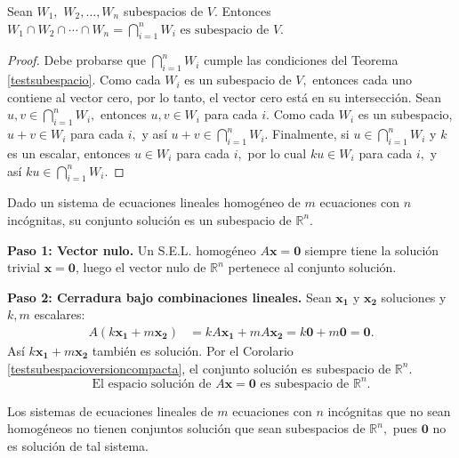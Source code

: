 \begin{theorem}\label{interseccionsubespacios}
Sean $W_1,$ $W_2,\dots, W_n$ subespacios de $V$. Entonces $W_1\cap W_2 \cap \cdots \cap W_n =\bigcap_{i=1}^{n} W_i\text{ es subespacio de }V.$

\begin{proof} Debe probarse que $\bigcap_{i=1}^{n} W_i$ cumple las condiciones del Teorema \ref{testsubespacio}. Como cada $W_i$ es un subespacio de $V,$ entonces cada uno contiene al vector cero, por lo tanto, el vector cero está en su intersección. Sean $u,v\in \bigcap_{i=1}^{n} W_i,$ entonces $u,v\in W_i$ para cada $i.$ Como cada $W_i$ es un subespacio, $u+v\in W_i$ para cada $i,$ y así $u+v\in \bigcap_{i=1}^{n} W_i.$ Finalmente, si $u\in \bigcap_{i=1}^{n} W_i$ y $k$ es un escalar, entonces $u\in W_i$ para cada $i,$ por lo cual $ku\in W_i$ para cada $i,$ y así $ku\in \bigcap_{i=1}^{n} W_i.$
\end{proof}
\end{theorem}

\begin{example}\label{thm:carsisthom}
Dado un sistema de ecuaciones lineales homogéneo de $m$ ecuaciones con $n$ incógnitas, su conjunto solución es un subespacio de $\mathbb{R}^n.$
\begin{myproof}
\textbf{Paso 1: Vector nulo.} Un S.E.L. homogéneo $A\mathbf{x}=\mathbf{0}$ siempre tiene la solución trivial $\mathbf{x}=\mathbf{0}$, luego el vector nulo de $\mathbb{R}^n$ pertenece al conjunto solución.

\textbf{Paso 2: Cerradura bajo combinaciones lineales.} Sean $\mathbf{x_1}$ y $\mathbf{x_2}$ soluciones y $k,m$ escalares:
\begin{align*}
A\left( k\mathbf{x_1}+m\mathbf{x_2} \right)&=kA\mathbf{x_1}+mA\mathbf{x_2}=k\mathbf{0}+m\mathbf{0}=\mathbf{0}.
\end{align*}
Así $k\mathbf{x_1}+m\mathbf{x_2}$ también es solución. Por el Corolario \ref{testsubespacioversioncompacta}, el conjunto solución es subespacio de $\mathbb{R}^n$.
$$\boxed{\text{El espacio solución de } A\mathbf{x}=\mathbf{0} \text{ es subespacio de } \mathbb{R}^n.}$$
\end{myproof}
\end{example}
\begin{rem} Los sistemas de ecuaciones lineales de $m$ ecuaciones con $n$ incógnitas que no sean homogéneos no tienen conjuntos solución que sean subespacios de $\mathbb{R}^n,$ pues $\mathbf{0}$ no es solución de tal sistema.
\end{rem}

